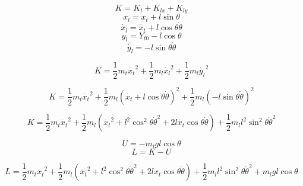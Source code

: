 \documentclass{article}
\begin{document}
            \begin{equation}\label{eq:kinetic1}
                K = K_t + K_{lx} + K_{ly}
            \end{equation}
            \begin{equation}\label{eq:xl}
                x_l=x_t+l\sin{\theta}
            \end{equation}
            \begin{equation}\label{eq:dxl}
                \dot{x_l}=\dot{x_t}+l\cos{\theta}\dot{\theta}
            \end{equation}
            \begin{equation}\label{eq:y}
                y_l=Y_{t0}-l\cos{\theta}
            \end{equation}
            \begin{equation}\label{eq:dy}
                \dot{y_l}=-l\sin{\theta}\dot{\theta}
            \end{equation}

            \begin{equation}\label{eq:kinetic2}
                K = \frac{1}{2}m_t\dot{x_t}^2   +\frac{1}{2}m_l\dot{x_l}^2  +\frac{1}{2}m_l\dot{y_l}^2
            \end{equation}

            \begin{equation}\label{eq:kinetic3}
                K = \frac{1}{2}m_t\dot{x_t}^2   +\frac{1}{2}m_l(\dot{x_t}+l\cos{\theta}\dot{\theta})^2  +\frac{1}{2}m_l(-l\sin{\theta}\dot{\theta})^2
            \end{equation}

            \begin{equation}\label{eq:kinetic4}
                    K = \frac{1}{2}m_t\dot{x_t}^2 +\frac{1}{2}m_l(\dot{x_t}^2+l^2\cos^2{\theta}\dot{\theta}^2
                    +2l\dot{x_t}\cos{\theta}\dot{\theta})+\frac{1}{2}m_ll^2\sin^2{\theta}\dot{\theta}^2
            \end{equation}

            \begin{equation}\label{eq:potential}
                U = -m_lgl\cos{\theta}
            \end{equation}
            \begin{equation}\label{eq:lagrange}
                L = K - U
            \end{equation}

            \begin{equation}\label{eq:lagrange2}
                    L = \frac{1}{2}m_t\dot{x_t}^2
                    +\frac{1}{2}m_l(\dot{x_t}^2
                +l^2\cos^2{\theta}\dot{\theta}^2
                +2l\dot{x_t}\cos{\theta}\dot{\theta})
                +\frac{1}{2}m_ll^2\sin^2{\theta}\dot{\theta}^2
                +m_lgl\cos{\theta}
            \end{equation}
\end{document}
